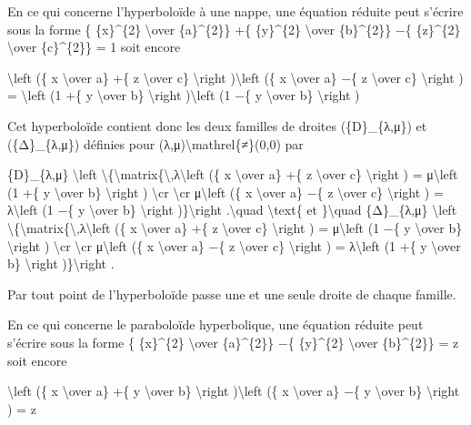 \documentclass[]{article}
\begin{document}
En ce qui concerne l'hyperboloïde à une nappe, une équation réduite peut
s'écrire sous la forme \{ \{x\}\^{}\{2\} \textbackslash{}over
\{a\}\^{}\{2\}\} +\{ \{y\}\^{}\{2\} \textbackslash{}over
\{b\}\^{}\{2\}\} −\{ \{z\}\^{}\{2\} \textbackslash{}over
\{c\}\^{}\{2\}\} = 1 soit encore

\textbackslash{}left (\{ x \textbackslash{}over a\} +\{ z
\textbackslash{}over c\} \textbackslash{}right )\textbackslash{}left (\{
x \textbackslash{}over a\} −\{ z \textbackslash{}over c\}
\textbackslash{}right ) = \textbackslash{}left (1 +\{ y
\textbackslash{}over b\} \textbackslash{}right )\textbackslash{}left (1
−\{ y \textbackslash{}over b\} \textbackslash{}right )

Cet hyperboloïde contient donc les deux familles de droites
(\{D\}\_\{λ,μ\}) et (\{Δ\}\_\{λ,μ\}) définies pour
(λ,μ)\textbackslash{}mathrel\{≠\}(0,0) par

\{D\}\_\{λ,μ\} \textbackslash{}left
\textbackslash{}\{\textbackslash{}matrix\{\textbackslash{},λ\textbackslash{}left
(\{ x \textbackslash{}over a\} +\{ z \textbackslash{}over c\}
\textbackslash{}right ) = μ\textbackslash{}left (1 +\{ y
\textbackslash{}over b\} \textbackslash{}right ) \textbackslash{}cr
\textbackslash{}cr μ\textbackslash{}left (\{ x \textbackslash{}over a\}
−\{ z \textbackslash{}over c\} \textbackslash{}right ) =
λ\textbackslash{}left (1 −\{ y \textbackslash{}over b\}
\textbackslash{}right )\}\textbackslash{}right .\textbackslash{}quad
\textbackslash{}text\{ et \}\textbackslash{}quad \{Δ\}\_\{λ,μ\}
\textbackslash{}left
\textbackslash{}\{\textbackslash{}matrix\{\textbackslash{},λ\textbackslash{}left
(\{ x \textbackslash{}over a\} +\{ z \textbackslash{}over c\}
\textbackslash{}right ) = μ\textbackslash{}left (1 −\{ y
\textbackslash{}over b\} \textbackslash{}right ) \textbackslash{}cr
\textbackslash{}cr μ\textbackslash{}left (\{ x \textbackslash{}over a\}
−\{ z \textbackslash{}over c\} \textbackslash{}right ) =
λ\textbackslash{}left (1 +\{ y \textbackslash{}over b\}
\textbackslash{}right )\}\textbackslash{}right .

Par tout point de l'hyperboloïde passe une et une seule droite de chaque
famille.

En ce qui concerne le paraboloïde hyperbolique, une équation réduite
peut s'écrire sous la forme \{ \{x\}\^{}\{2\} \textbackslash{}over
\{a\}\^{}\{2\}\} −\{ \{y\}\^{}\{2\} \textbackslash{}over
\{b\}\^{}\{2\}\} = z soit encore

\textbackslash{}left (\{ x \textbackslash{}over a\} +\{ y
\textbackslash{}over b\} \textbackslash{}right )\textbackslash{}left (\{
x \textbackslash{}over a\} −\{ y \textbackslash{}over b\}
\textbackslash{}right ) = z
\end{document}
